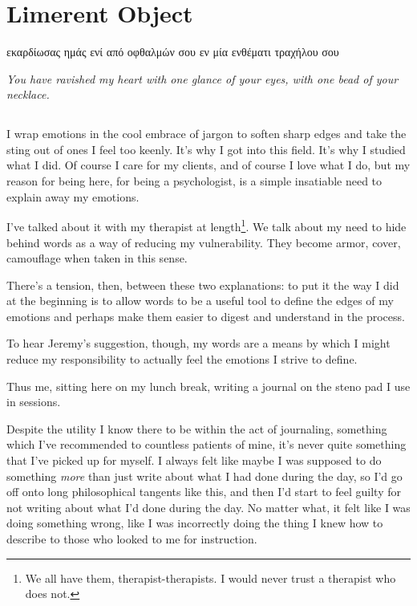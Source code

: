 \chapter{Limerent Object}

\begin{flushright}
{\ChapterFont εκαρδίωσας ημάς ενί από οφθαλμών σου εν μία ενθέματι τραχήλου σου}

\vspace{20pt}

\emph{You have ravished my heart with one glance of your eyes, with one bead of your necklace.}
\end{flushright}

\newpage

\section{}
I wrap emotions in the cool embrace of jargon to soften sharp edges and take the sting out of ones I feel too keenly. It's why I got into this field. It's why I studied what I did. Of course I care for my clients, and of course I love what I do, but my reason for being here, for being a psychologist, is a simple insatiable need to explain away my emotions.

I've talked about it with my therapist at length\footnote{We all have them, therapist-therapists. I would never trust a therapist who does not.}. We talk about my need to hide behind words as a way of reducing my vulnerability. They become armor, cover, camouflage when taken in this sense.

There's a tension, then, between these two explanations: to put it the way I did at the beginning is to allow words to be a useful tool to define the edges of my emotions and perhaps make them easier to digest and understand in the process.

To hear Jeremy's suggestion, though, my words are a means by which I might reduce my responsibility to actually feel the emotions I strive to define.

Thus me, sitting here on my lunch break, writing a journal on the steno pad I use in sessions.

Despite the utility I know there to be within the act of journaling, something which I've recommended to countless patients of mine, it's never quite something that I've picked up for myself. I always felt like maybe I was supposed to do something \emph{more} than just write about what I had done during the day, so I'd go off onto long philosophical tangents like this, and then I'd start to feel guilty for not writing about what I'd done during the day. No matter what, it felt like I was doing something wrong, like I was incorrectly doing the thing I knew how to describe to those who looked to me for instruction.

